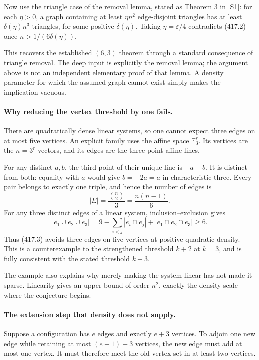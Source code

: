 \documentclass[11pt]{article}
\begin{document}
Now use the triangle case of the removal lemma, stated as Theorem 3 in [S1]: for each $\eta>0$, a graph containing at least $\eta n^2$ edge-disjoint triangles has at least $\delta(\eta)n^3$ triangles, for some positive $\delta(\eta)$. Taking $\eta=\varepsilon/4$ contradicts (417.2) once $n>1/(6\delta(\eta))$.

This recovers the established $(6,3)$ theorem through a standard consequence of triangle removal. The deep input is explicitly the removal lemma; the argument above is not an independent elementary proof of that lemma. A density parameter for which the assumed graph cannot exist simply makes the implication vacuous.

\paragraph{Why reducing the vertex threshold by one fails.}
There are quadratically dense linear systems, so one cannot expect three edges on at most five vertices. An explicit family uses the affine space $\mathbb F_3^r$. Its vertices are the $n=3^r$ vectors, and its edges are the three-point affine lines.

For any distinct $a,b$, the third point of their unique line is $-a-b$. It is distinct from both: equality with $a$ would give $b=-2a=a$ in characteristic three. Every pair belongs to exactly one triple, and hence the number of edges is
\[
 |E|=\frac{\binom n2}{3}=\frac{n(n-1)}6.
 \tag{417.3}
\]
For any three distinct edges of a linear system, inclusion--exclusion gives
\[
 |e_1\cup e_2\cup e_3|
 =9-\sum_{i<j}|e_i\cap e_j|+|e_1\cap e_2\cap e_3|
 \ge6.
\]
Thus (417.3) avoids three edges on five vertices at positive quadratic density. This is a counterexample to the strengthened threshold $k+2$ at $k=3$, and is fully consistent with the stated threshold $k+3$.

The example also explains why merely making the system linear has not made it sparse. Linearity gives an upper bound of order $n^2$, exactly the density scale where the conjecture begins.

\paragraph{The extension step that density does not supply.}
Suppose a configuration has $e$ edges and exactly $e+3$ vertices. To adjoin one new edge while retaining at most $(e+1)+3$ vertices, the new edge must add at most one vertex. It must therefore meet the old vertex set in at least two vertices.
\end{document}
